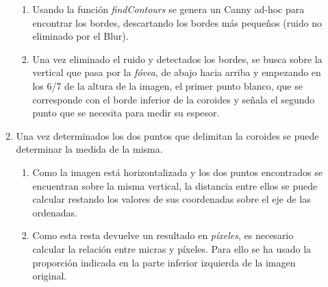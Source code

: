 \begin{enumerate}
\begin{enumerate}[label*=\arabic*.]
\begin{enumerate}[label*=\arabic*.]
    \item Usando la función \emph{findContours} se genera un Canny ad-hoc
    para encontrar los bordes, descartando los bordes más pequeños (ruido no
    eliminado por el Blur).
    \item Una vez eliminado el ruido y detectados los bordes, se busca sobre
    la vertical que pasa por la \emph{fóvea}, de abajo hacia arriba y empezando
    en los 6/7 de la altura de la imagen, el primer punto blanco, que se corresponde
    con el borde inferior de la coroides y señala el segundo punto que se 
    necesita para medir su espesor. 
    \end{enumerate}
  \item Una vez determinados los dos puntos que delimitan la coroides se
    puede determinar la medida de la misma.
    \begin{enumerate}[label*=\arabic*.]
    \item Como la imagen está horizontalizada y los dos puntos encontrados
    se encuentran sobre la misma vertical, la distancia entre ellos se 
    puede calcular restando los valores de sus coordenadas sobre el eje de
    las ordenadas.
    \item Como esta resta devuelve un resultado en \emph{píxeles}, es necesario
    calcular la relación entre micras y píxeles. Para ello se ha usado la 
    proporción indicada en la parte inferior izquierda de la imagen original.
    \end{enumerate}
  \end{enumerate}
\end{enumerate}
